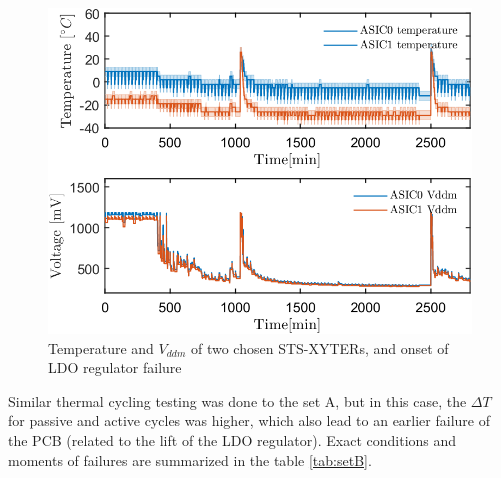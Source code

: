 \begin{figure}[!h]
\centering
\includegraphics[width=0.6\columnwidth]{Chapter4/images/temps_vddm.png}
\caption{Temperature and $V_{ddm}$ of two chosen STS-XYTERs, and onset of \gls{LDO} regulator failure}
\label{fig_cold_startup_vddm}
\end{figure}

Similar thermal cycling testing was done to the set A, but in this case, the $\Delta T$ for passive and active cycles was higher, which also lead to an earlier failure of the \gls{PCB} (related to the lift of the \gls{LDO} regulator). Exact conditions and moments of failures are summarized in the table \ref{tab:setB}.

